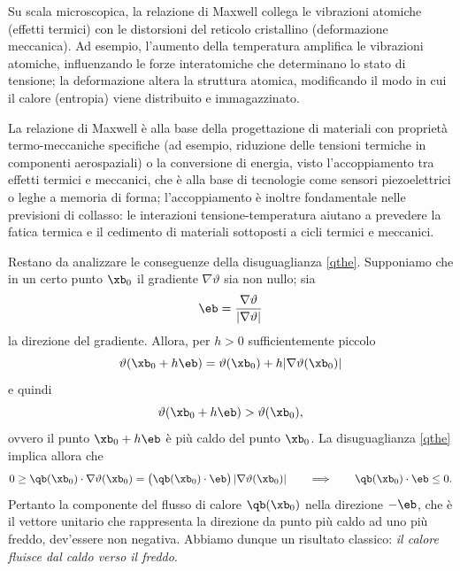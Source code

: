  Su scala microscopica, la relazione di Maxwell collega le vibrazioni atomiche (effetti termici) con le distorsioni del reticolo cristallino (deformazione meccanica). Ad esempio, l’aumento della temperatura amplifica le vibrazioni atomiche, influenzando le forze interatomiche che determinano lo stato di tensione; la deformazione altera la struttura atomica, modificando il modo in cui il calore (entropia) viene distribuito e immagazzinato.


\begin{remark}
La relazione di Maxwell  è alla base della progettazione di materiali con proprietà termo-meccaniche specifiche (ad esempio, riduzione delle tensioni termiche in componenti aerospaziali) o la conversione di energia,  visto l’accoppiamento tra effetti termici e meccanici, che è alla base di tecnologie come sensori piezoelettrici o leghe a memoria di forma; l'accoppiamento è inoltre fondamentale nelle previsioni di collasso: le interazioni tensione-temperatura aiutano a prevedere la fatica termica e il cedimento di materiali sottoposti a cicli termici e meccanici.
\end{remark}

Restano da analizzare le conseguenze della disuguaglianza \eqref{qthe}. Supponiamo che in un certo punto $\xb_0$ il gradiente $\nabla\vartheta$ sia non nullo;  sia
\begin{equation}
	\eb=\frac{\nabla\vartheta}{|\nabla\vartheta|}
\end{equation}
la direzione del gradiente. Allora, per $h>0$ sufficientemente piccolo
\begin{equation}
\vartheta(\xb_0+h\eb)=\vartheta(\xb_0)+h|\nabla\vartheta(\xb_0)|
\end{equation}
e quindi
\begin{equation}
\vartheta(\xb_0+h\eb)>\vartheta(\xb_0),
\end{equation}
ovvero il punto $\xb_0+h \eb$ è più caldo del punto $\xb_0$. La disuguaglianza \eqref{qthe} implica allora che
\begin{equation}
	0\geq \qb(\xb_0)\cdot\nabla\vartheta(\xb_0)=\big( \qb(\xb_0)\cdot \eb \big)\, |\nabla\vartheta(\xb_0)|  \qquad \Longrightarrow \qquad  \qb(\xb_0)\cdot\eb\leq 0.
\end{equation}
Pertanto la componente del flusso di calore $\qb(\xb_0)$ nella direzione $-\eb$, che è il vettore unitario che rappresenta la direzione da punto più caldo ad uno più freddo, dev'essere non negativa. Abbiamo dunque un risultato classico:\textit{ il calore fluisce dal caldo verso il freddo}.

